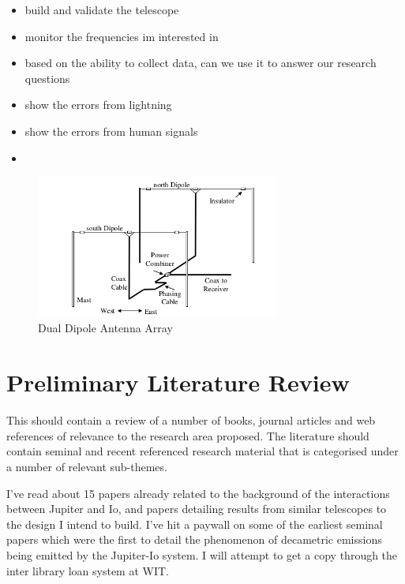 \documentclass[runningheads,a4paper]{llncs}
\begin{document}
\begin{itemize}
  \item build and validate the telescope
  \item monitor the frequencies im interested in
  \item based on the ability to collect data, can we use it to answer our research questions
  \item show the errors from lightning
  \item show the errors from human signals
  \item 
\end{itemize}


%
\begin{figure}[here]
\centering
\includegraphics[width=8cm]{images/08}
\caption{Dual Dipole Antenna Array \citep{nasa12}}
\label{fig:dual_dipole_antenna_array}
\end{figure}
%

%
%
\newpage
\section*{Preliminary Literature Review}
This should contain a review of a number of books, journal articles and web references of relevance to the research area proposed. The literature should contain seminal and recent referenced research material that is categorised under a number of relevant sub-themes.


I've read about 15 papers already related to the background of the interactions between Jupiter and Io, and papers detailing results from similar telescopes to the design I intend to build. I've hit a paywall on some of the earliest seminal papers which were the first to detail the phenomenon of decametric emissions being emitted by the Jupiter-Io system. I will attempt to get a copy through the inter library loan system at WIT.
\end{document}
